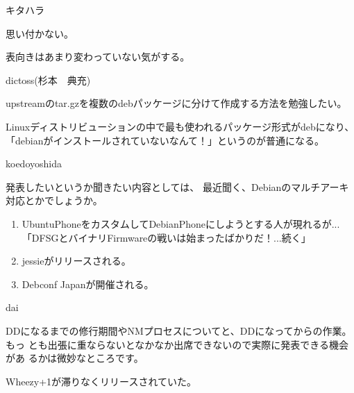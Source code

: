 
\begin{prework}{ キタハラ }


 思い付かない。


 表向きはあまり変わっていない気がする。

\end{prework}

\begin{prework}{ dictoss(杉本　典充) }


 upstreamのtar.gzを複数のdebパッケージに分けて作成する方法を勉強したい。


 Linuxディストリビューションの中で最も使われるパッケージ形式がdebになり、
「debianがインストールされていないなんて！」というのが普通になる。

\end{prework}

\begin{prework}{ koedoyoshida }


 発表したいというか聞きたい内容としては、
最近聞く、Debianのマルチアーキ対応とかでしょうか。

\begin{enumerate}
\item UbuntuPhoneをカスタムしてDebianPhoneにしようとする人が現れるが...\\
「DFSGとバイナリFirmwareの戦いは始まったばかりだ！...続く」
\item jessieがリリースされる。
\item Debconf Japanが開催される。
\end{enumerate}
\end{prework}

\begin{prework}{ dai }


 DDになるまでの修行期間やNMプロセスについてと、DDになってからの作業。もっ
とも出張に重ならないとなかなか出席できないので実際に発表できる機会があ
るかは微妙なところです。


Wheezy+1が滞りなくリリースされていた。

\end{prework}

